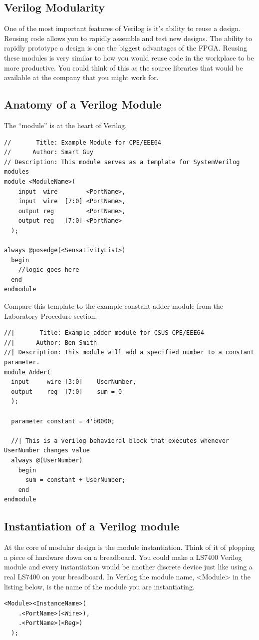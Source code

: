 \documentclass[12pt,journal]{IEEEtran}
\begin{document}
    \subsection{Verilog Modularity}
      One of the most important features of Verilog is it's ability to reuse a design. Reusing code allows you to  rapidly assemble and test new designs. The ability to rapidly prototype a design is one the biggest advantages of the FPGA. Reusing these modules is very similar to how you would reuse code in the workplace to be more productive. You could think of this as the source libraries that would be available at the company that you might work for.

    \subsection{Anatomy of a Verilog Module}
      The ``module'' is at the heart of Verilog. 
      \begin{lstlisting}[caption={Example Module}]
//       Title: Example Module for CPE/EEE64
//      Author: Smart Guy
// Description: This module serves as a template for SystemVerilog modules
module <ModuleName>(
    input  wire        <PortName>,
    input  wire  [7:0] <PortName>,
    output reg         <PortName>,
    output reg   [7:0] <PortName>
  );

always @posedge(<SensativityList>)
  begin
    //logic goes here
  end
endmodule
      \end{lstlisting}
      Compare this template to the example constant adder module from the Laboratory Procedure section.
\begin{lstlisting}
//|       Title: Example adder module for CSUS CPE/EEE64
//|      Author: Ben Smith
//| Description: This module will add a specified number to a constant parameter.
module Adder(
  input     wire [3:0]    UserNumber,
  output    reg  [7:0]    sum = 0
  );

  parameter constant = 4'b0000;

  //| This is a verilog behavioral block that executes whenever UserNumber changes value
  always @(UserNumber)
    begin
      sum = constant + UserNumber;
    end
endmodule
\end{lstlisting}

    \subsection{Instantiation of a Verilog module}
      At the core of modular design is the module instantiation. Think of it of plopping a piece of hardware down on a breadboard. You could make a LS7400 Verilog module and every instantiation would be another discrete device just like using a real LS7400 on your breadboard. In Verilog the module name, <Module> in the listing below, is the name of the module you are instantiating.
    \begin{lstlisting}[caption={Module instantiation template}]
<Module><InstanceName>(
    .<PortName>(<Wire>),
    .<PortName>(<Reg>)
  );
    \end{lstlisting}
    
\end{document}
